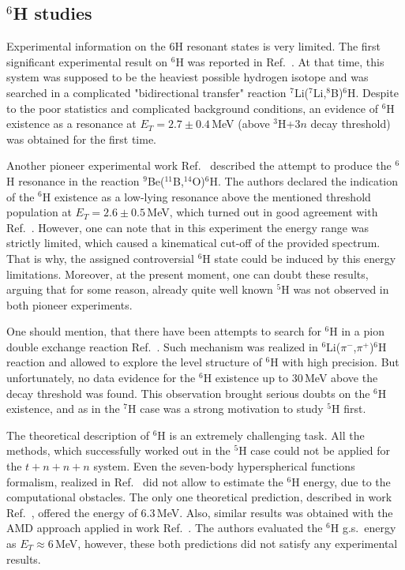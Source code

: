 \subsection{$^{6}$H studies}

Experimental information on the 6H resonant states is very limited.
The first significant experimental result on $^{6}$H was reported in Ref.\ \cite{Aleksandrov:1984}.
At that time, this system was supposed to be the heaviest possible hydrogen isotope and was searched in a complicated "bidirectional transfer" reaction $^7$Li($^7$Li,$^8$B)$^6$H.
Despite to the poor statistics and complicated background conditions, an evidence of $^{6}$H existence as a resonance at $E_T= 2.7\pm 0.4$\,MeV (above $^3$H+$3n$ decay threshold) was obtained for the first time.

Another pioneer experimental work Ref.\ \cite{Belozyorov:1986} described the attempt to produce the $^{6}$H resonance in the reaction $^9$Be($^{11}$B,$^{14}$O)$^6$H.
The authors declared the indication of the $^{6}$H existence as a low-lying resonance above the mentioned threshold population at $E_T= 2.6\pm 0.5$\,MeV, which turned out in good agreement with Ref.\ \cite{Aleksandrov:1984}.
However, one can note that in this experiment the energy range was strictly limited, which caused a kinematical cut-off of the provided spectrum.
That is why, the assigned controversial $^{6}$H state could be induced by this energy limitations.
Moreover, at the present moment, one can doubt these results, arguing that for some reason, already quite well known $^{5}$H was not observed in both pioneer experiments.

One should mention, that there have been attempts to search for $^{6}$H in a pion double exchange reaction Ref.\ \cite{PARKER:1990483}.
Such mechanism was realized in $^6$Li($\pi ^{-}$,$\pi ^{+}$)$^{6}$H reaction and allowed to explore the level
structure of $^{6}$H with high precision. 
But unfortunately, no data evidence for the $^{6}$H existence up to 30\,MeV above the decay threshold was found.
This observation brought serious doubts on the $^{6}$H existence, and as in the $^{7}$H case was a strong motivation to study $^{5}$H first.

The theoretical description of $^{6}$H is an extremely challenging task.
All the methods, which successfully worked out in the $^{5}$H case could not be applied for the $t+n+n+n$ system.
Even the seven-body hyperspherical functions formalism, realized in Ref.\ \cite{Timofeyuk:2002} did not allow to estimate the $^{6}$H energy, due to the computational obstacles.
The only one theoretical prediction, described in work Ref.\ \cite{Gorbatov:1989}, offered the energy of $6.3$\,MeV.
Also, similar results was obtained with the AMD approach applied in work Ref.\ \cite{Aoyama:2004}.
The authors evaluated the $^{6}$H g.s.\ energy as $E_{T} \approx 6$\,MeV, however, these both predictions did not satisfy any experimental results. 

